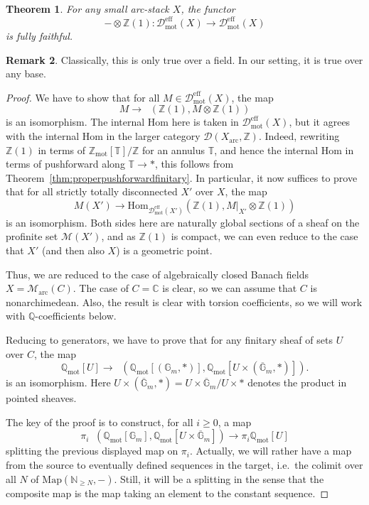 \documentclass[11pt]{amsart}
\DeclareMathOperator{\intHom}{\!{\mathscr{H}\! om}}
\numberwithin{equation}{section}
\newtheorem{theorem}{Theorem}
\numberwithin{theorem}{section}
\theoremstyle{definition}
\newtheorem{remark}[theorem]{Remark}
\begin{document}
\begin{theorem}\label{thm:cancellation} For any small arc-stack $X$, the functor
\[
-\otimes \mathbb Z(1): \mathcal D_{\mathrm{mot}}^{\mathrm{eff}}(X)\to \mathcal D_{\mathrm{mot}}^{\mathrm{eff}}(X)
\]
is fully faithful.
\end{theorem}

\begin{remark} Classically, this is only true over a field. In our setting, it is true over any base.
\end{remark}

\begin{proof} We have to show that for all $M\in \mathcal D_{\mathrm{mot}}^{\mathrm{eff}}(X)$, the map
\[
M\to \intHom(\mathbb Z(1),M\otimes \mathbb Z(1))
\]
is an isomorphism. The internal Hom here is taken in $\mathcal D_{\mathrm{mot}}^{\mathrm{eff}}(X)$, but it agrees with the internal Hom in the larger category $\mathcal D(X_{\mathrm{arc}},\mathbb Z)$. Indeed, rewriting $\mathbb Z(1)$ in terms of $\mathbb Z_{\mathrm{mot}}[\mathbb T]/\mathbb Z$ for an annulus $\mathbb T$, and hence the internal Hom in terms of pushforward along $\mathbb T\to \ast$, this follows from Theorem~\ref{thm:properpushforwardfinitary}. In particular, it now suffices to prove that for all strictly totally disconnected $X'$ over $X$, the map
\[
M(X')\to \mathrm{Hom}_{\mathcal D_{\mathrm{mot}}^{\mathrm{eff}}(X')}(\mathbb Z(1),M|_{X'}\otimes \mathbb Z(1))
\]
is an isomorphism. Both sides here are naturally global sections of a sheaf on the profinite set $\mathcal M(X')$, and as $\mathbb Z(1)$ is compact, we can even reduce to the case that $X'$ (and then also $X$) is a geometric point.

Thus, we are reduced to the case of algebraically closed Banach fields $X=\mathcal M_{\mathrm{arc}}(C)$. The case of $C=\mathbb C$ is clear, so we can assume that $C$ is nonarchimedean. Also, the result is clear with torsion coefficients, so we will work with $\mathbb Q$-coefficients below.

Reducing to generators, we have to prove that for any finitary sheaf of sets $U$ over $C$, the map
\[
\mathbb Q_{\mathrm{mot}}[U]\to \intHom(\mathbb Q_{\mathrm{mot}}[(\mathbb G_m,\ast)],\mathbb Q_{\mathrm{mot}}[U\times (\overline{\mathbb G}_m,\ast)]).
\]
is an isomorphism. Here $U\times (\overline{\mathbb G}_m,\ast) = U\times\overline{\mathbb G}_m/U\times \ast$ denotes the product in pointed sheaves.

The key of the proof is to construct, for all $i\geq 0$, a map
\[
\pi_i \intHom(\mathbb Q_{\mathrm{mot}}[\mathbb G_m],\mathbb Q_{\mathrm{mot}}[U\times \overline{\mathbb G}_m])\to \pi_i \mathbb Q_{\mathrm{mot}}[U]
\]
splitting the previous displayed map on $\pi_i$. Actually, we will rather have a map from the source to eventually defined sequences in the target, i.e.~the colimit over all $N$ of $\mathrm{Map}(\mathbb N_{\geq N},-)$. Still, it will be a splitting in the sense that the composite map is the map taking an element to the constant sequence.


\end{proof}
\end{document}
